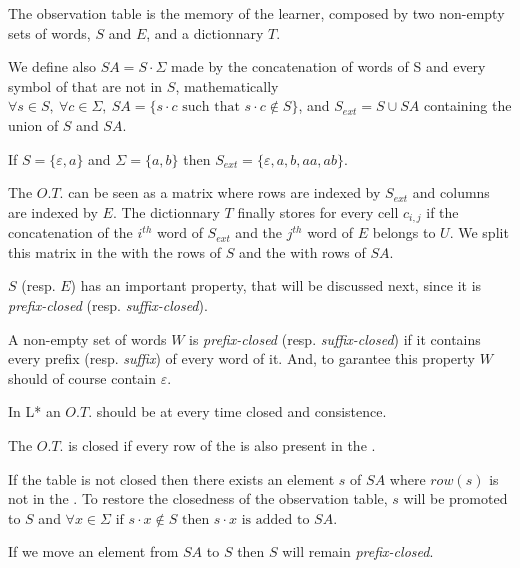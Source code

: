 \begin{definition}
  The observation table is the memory of the learner, composed by two non-empty sets of words, $S$ and $E$, and a dictionnary $T$.
\end{definition}

We define also $SA = S \cdot \Sigma$ made by the concatenation of words of S and every symbol of \alphabet{} that are not in $S$, mathematically $\forall s \in S, \: \forall c \in \Sigma, \: SA = \{s \cdot c \text{ such that } s \cdot c \notin S \} $, and $S_{ext} = S \cup SA$ containing the union of $S$ and $SA$.
\begin{exmp}
  If $S = \{\varepsilon, a\}$ and $\Sigma = \{a, b\}$ then $S_{ext} = \{\varepsilon, a, b, aa, ab\}$.
\end{exmp}

The $O.T.$ can be seen as a matrix where rows are indexed by $S_{ext}$ and columns are indexed by $E$. The dictionnary $T$ finally stores for every cell $c_{i,j}$ if the concatenation of the $i^{th}$ word of $S_{ext}$ and the $j^{th}$ word of $E$ belongs to $U$. We split this matrix in the \upperPart{} with the rows of $S$ and the \lowerPart{} with rows of $SA$.


$S$ (resp. $E$) has an important property, that will be discussed next, since it is \textit{prefix-closed} (resp. \textit{suffix-closed}).

\begin{definition}
  A non-empty set of words $W$ is \textit{prefix-closed} (resp. \textit{suffix-closed}) if it contains every prefix (resp. \textit{suffix}) of every word of it. And, to garantee this property $W$ should of course contain $\varepsilon$.
\end{definition}

In L* an $O.T.$ should be at every time closed and consistence.

\begin{definition}[Closedness]
  The $O.T.$ is closed if every row of the \lowerPart{} is also present in the \upperPart{}.
\end{definition}

If the table is not closed then there exists an element $s$ of $SA$ where $row(s)$ is not in the \upperPart{}. To restore the closedness of the observation table, $s$ will be promoted to $S$ and $\forall x \in \Sigma \text{ if } s \cdot x \notin S \text{ then } s \cdot x \text{ is added to } SA$.

\begin{lemma}
  \label{lemmaPromoteLinePrefixClosedness}
  If we move an element from $SA$ to $S$ then $S$ will remain \textit{prefix-closed}.
\end{lemma}

